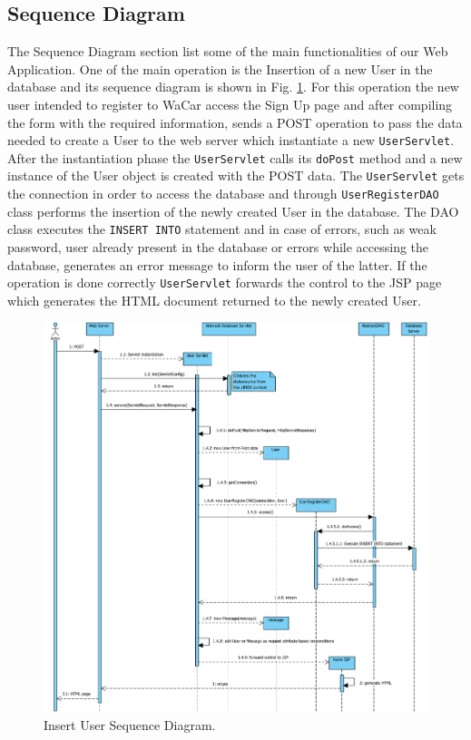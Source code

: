 \subsection{Sequence Diagram}

The Sequence Diagram section list some of the main functionalities of our Web Application.
One of the main operation is the Insertion of a new User in the database and its sequence diagram is shown in Fig. \ref{fig:insertuser}.
For this operation the new user intended to register to WaCar access the Sign Up page and after compiling the form with the required information,
sends a POST operation to pass the data needed to create a User to the web server which instantiate a new \texttt{UserServlet}. After the instantiation phase
the \texttt{UserServlet} calls its \texttt{doPost} method and a new instance of the User object is created with the POST data. The \texttt{UserServlet} gets the connection
in order to access the database and through \texttt{UserRegisterDAO} class performs the insertion of the newly created User in the database. The DAO class executes
the \texttt{INSERT INTO} statement and in case of errors, such as weak password, user already present in the database or errors while accessing the database,
generates an error message to inform the user of the latter. If the operation is done correctly \texttt{UserServlet} forwards the control to the JSP page which
generates the HTML document returned to the newly created User.

\begin{figure}[H]
    \centering
    \includegraphics[width=\textwidth]{mockup/InsertUserDiagram}
    \caption{Insert User Sequence Diagram.}
    \label{fig:insertuser}
\end{figure}

